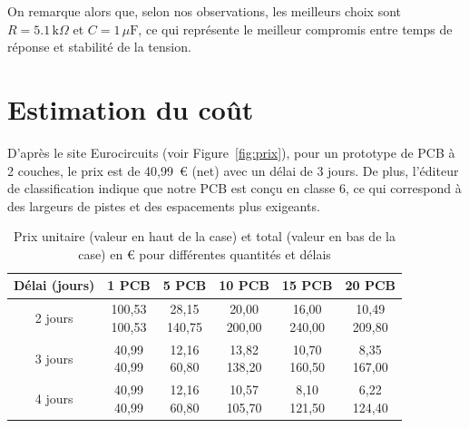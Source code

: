 \documentclass[12pt, a4paper, titlepage]{article}
\begin{document}
On remarque alors que, selon nos observations, les meilleurs choix sont \(R = 5.1\,\mathrm{k}\Omega\) et \(C = 1\,\mu\mathrm{F}\), ce qui représente le meilleur compromis entre temps de réponse et stabilité de la tension.

\section{Estimation du coût}

D'après le site Eurocircuits (voir Figure~\ref{fig:prix}), pour un prototype de PCB à 2 couches, le prix est de 40,99~€ (net) avec un délai de 3 jours. De plus, l'éditeur de classification indique que notre PCB est conçu en classe 6, ce qui correspond à des largeurs de pistes et des espacements plus exigeants.

{
\renewcommand{\arraystretch}{2.2}
\begin{table}[ht]
\centering
\caption{Prix unitaire (valeur en haut de la case) et total (valeur en bas de la case) en € pour différentes quantités et délais}
\label{tab:fullPriceMatrix}
\begin{tabular}{|c|c|c|c|c|c|}
\hline
\textbf{Délai (jours)} & \textbf{1 PCB} & \textbf{5 PCB} & \textbf{10 PCB} & \textbf{15 PCB} & \textbf{20 PCB} \\
\hline
2 jours & 
\shortstack{100,53 \\ 100,53} & 
\shortstack{28,15 \\ 140,75} & 
\shortstack{20,00 \\ 200,00} & 
\shortstack{16,00 \\ 240,00} & 
\shortstack{10,49 \\ 209,80} \\
\hline
3 jours & 
\shortstack{40,99 \\ 40,99} & 
\shortstack{12,16 \\ 60,80} & 
\shortstack{13,82 \\ 138,20} & 
\shortstack{10,70 \\ 160,50} & 
\shortstack{8,35 \\ 167,00} \\
\hline
4 jours & 
\shortstack{40,99 \\ 40,99} & 
\shortstack{12,16 \\ 60,80} & 
\shortstack{10,57 \\ 105,70} & 
\shortstack{8,10 \\ 121,50} & 
\shortstack{6,22 \\ 124,40} \\

\end{tabular}
\end{table}}
\end{document}
